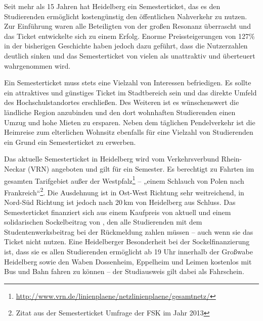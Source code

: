 % 
% 

Seit mehr als 15 Jahren hat Heidelberg ein Semesterticket, das es den
Studierenden ermöglicht kostengünstig den öffentlichen Nahverkehr zu nutzen.
Zur Einführung waren alle Beteiligten von der großen Resonanz überrascht und
das Ticket entwickelte sich zu einem Erfolg. Enorme Preissteigerungen von
127\% in der bisherigen Geschichte haben jedoch dazu geführt, dass die
Nutzerzahlen deutlich sinken und das Semesterticket von vielen als unattraktiv
und überteuert wahrgenommen wird.

Ein Semesterticket muss stets eine Vielzahl von Interessen befriedigen. Es
sollte ein attraktives und günstiges Ticket im Stadtbereich sein und das
direkte Umfeld des Hochschulstandortes erschließen. Des Weiteren ist es
wünschenswert die ländliche Region anzubinden und den dort wohnhaften
Studierenden einen Umzug und hohe Mieten zu ersparen. Neben dem täglichen
Pendelverkehr ist die Heimreise zum elterlichen Wohnsitz ebenfalls für eine
Vielzahl von Studierenden ein Grund ein Semesterticket zu erwerben.

Das aktuelle Semesterticket in Heidelberg wird vom Verkehrsverbund Rhein-Neckar
(VRN) angeboten und gilt für ein Semester. Es berechtigt zu Fahrten im gesamten
Tarifgebiet außer der
Westpfalz\footnote{\url{http://www.vrn.de/linienplaene/netzlinienplaene/gesamtnetz/}}
-- „einem Schlauch von Polen nach Frankreich“\footnote{Zitat aus der
Semesterticket Umfrage der FSK im Jahr 2013}. Die Ausdehnung ist in Ost-West
Richtung sehr weitreichend, in Nord-Süd Richtung ist jedoch nach 20\,km von
Heidelberg aus Schluss. Das Semesterticket finanziert sich aus einem Kaufpreis
von aktuell \EUR{\semesterticket} und einem solidarischen Sockelbeitrag von
\EUR{\sockelbeitrag}, den alle Studierenden mit dem Studentenwerksbeitrag bei
der Rückmeldung zahlen müssen -- auch wenn sie das Ticket nicht nutzen. Eine
Heidelberger Besonderheit bei der Sockelfinanzierung ist, dass sie es allen
Studierenden ermöglicht ab 19 Uhr innerhalb der Großwabe Heidelberg sowie den
Waben Dossenheim, Eppelheim und Leimen kostenlos mit Bus und Bahn fahren zu
können -- der Studiausweis gilt dabei als Fahrschein.

